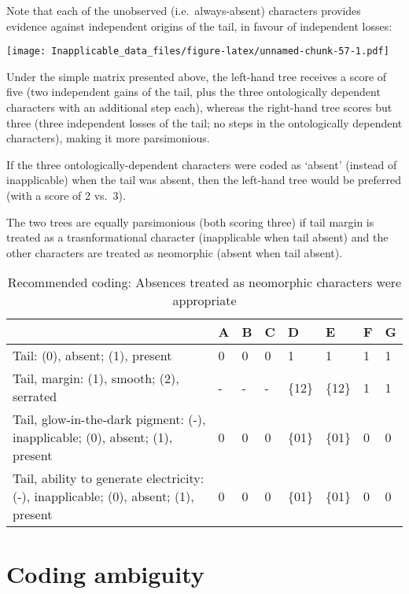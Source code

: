 \documentclass[]{book}
\theoremstyle{definition}
\theoremstyle{definition}
\theoremstyle{definition}
\theoremstyle{remark}
\begin{document}
Note that each of the unobserved (i.e.~always-absent) characters
provides evidence against independent origins of the tail, in favour of
independent losses:

\texttt{[image: Inapplicable\_data\_files/figure-latex/unnamed-chunk-57-1.pdf]}

Under the simple matrix presented above, the left-hand tree receives a
score of five (two independent gains of the tail, plus the three
ontologically dependent characters with an additional step each),
whereas the right-hand tree scores but three (three independent losses
of the tail; no steps in the ontologically dependent characters), making
it more parsimonious.

If the three ontologically-dependent characters were coded as `absent'
(instead of inapplicable) when the tail was absent, then the left-hand
tree would be preferred (with a score of 2 vs.~3).

The two trees are equally parsimonious (both scoring three) if tail
margin is treated as a trasnformational character (inapplicable when
tail absent) and the other characters are treated as neomorphic (absent
when tail absent).

\begin{table}

\caption{\label{tab:unnamed-chunk-58}Recommended coding: Absences treated as neomorphic characters were appropriate}
\centering
\begin{tabular}[t]{l|l|l|l|l|l|l|l}
\hline
  & A & B & C & D & E & F & G\\
\hline
Tail: (0), absent; (1), present & 0 & 0 & 0 & 1 & 1 & 1 & 1\\
\hline
Tail, margin: (1), smooth; (2), serrated & - & - & - & \{12\} & \{12\} & 1 & 1\\
\hline
Tail, glow-in-the-dark pigment: (-), inapplicable; (0), absent; (1), present & 0 & 0 & 0 & \{01\} & \{01\} & 0 & 0\\
\hline
Tail, ability to generate electricity: (-), inapplicable; (0), absent; (1), present & 0 & 0 & 0 & \{01\} & \{01\} & 0 & 0\\
\hline
\end{tabular}
\end{table}

\hypertarget{ambiguity}{%
\chapter{Coding ambiguity}\label{ambiguity}}
\end{document}
